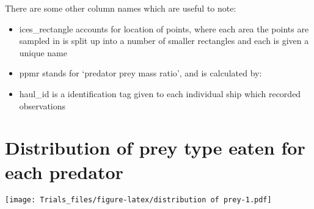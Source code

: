 \documentclass[
]{article}
\newenvironment{Shaded}{\begin{snugshade}}{\end{snugshade}}
\newcommand{\AttributeTok}[1]{\textcolor[rgb]{0.77,0.63,0.00}{#1}}
\newcommand{\FloatTok}[1]{\textcolor[rgb]{0.00,0.00,0.81}{#1}}
\newcommand{\FunctionTok}[1]{\textcolor[rgb]{0.00,0.00,0.00}{#1}}
\newcommand{\NormalTok}[1]{#1}
\newcommand{\SpecialCharTok}[1]{\textcolor[rgb]{0.00,0.00,0.00}{#1}}
\newcommand{\StringTok}[1]{\textcolor[rgb]{0.31,0.60,0.02}{#1}}
\providecommand{\tightlist}{%
  \setlength{\itemsep}{0pt}\setlength{\parskip}{0pt}}
\begin{document}
There are some other column names which are useful to note:

\begin{itemize}
\tightlist
\item
  ices\_rectangle accounts for location of points, where each area the
  points are sampled in is split up into a number of smaller rectangles
  and each is given a unique name
\item
  ppmr stands for `predator prey mass ratio', and is calculated by:
\item
  haul\_id is a identification tag given to each individual ship which
  recorded observations
\end{itemize}

\hypertarget{distribution-of-prey-type-eaten-for-each-predator}{%
\section{Distribution of prey type eaten for each
predator}\label{distribution-of-prey-type-eaten-for-each-predator}}

\begin{Shaded}
\end{Shaded}

\texttt{[image: Trials\_files/figure-latex/distribution of prey-1.pdf]}
\end{document}
